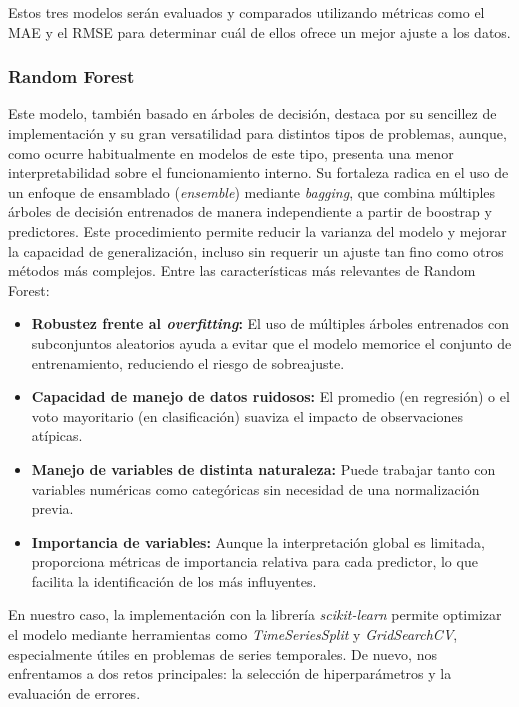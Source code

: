 Estos tres modelos serán evaluados y comparados utilizando métricas como el MAE y el RMSE para determinar cuál de ellos ofrece un mejor ajuste a los datos.
%
%
%
\subsubsection{Random Forest}
%
%
%
Este modelo, también basado en árboles de decisión, destaca por su sencillez de implementación y su gran versatilidad para distintos tipos de problemas, aunque, como ocurre habitualmente en modelos de este tipo, presenta una menor interpretabilidad sobre el funcionamiento interno. Su fortaleza radica en el uso de un enfoque de ensamblado (\textit{ensemble}) mediante \textit{bagging}, que combina múltiples árboles de decisión entrenados de manera independiente a partir de boostrap y predictores. Este procedimiento permite reducir la varianza del modelo y mejorar la capacidad de generalización, incluso sin requerir un ajuste tan fino como otros métodos más complejos. Entre las características más relevantes de Random Forest:

\begin{itemize}
    \item \textbf{Robustez frente al \textit{overfitting}:} El uso de múltiples árboles entrenados con subconjuntos aleatorios ayuda a evitar que el modelo memorice el conjunto de entrenamiento, reduciendo el riesgo de sobreajuste.
    \item \textbf{Capacidad de manejo de datos ruidosos:} El promedio (en regresión) o el voto mayoritario (en clasificación) suaviza el impacto de observaciones atípicas.
    \item \textbf{Manejo de variables de distinta naturaleza:} Puede trabajar tanto con variables numéricas como categóricas sin necesidad de una normalización previa.
    \item \textbf{Importancia de variables:} Aunque la interpretación global es limitada, proporciona métricas de importancia relativa para cada predictor, lo que facilita la identificación de los más influyentes.
\end{itemize}

En nuestro caso, la implementación con la librería \textit{scikit-learn} permite optimizar el modelo mediante herramientas como \textit{TimeSeriesSplit} y \textit{GridSearchCV}, especialmente útiles en problemas de series temporales. De nuevo, nos enfrentamos a dos retos principales: la selección de hiperparámetros y la evaluación de errores.

